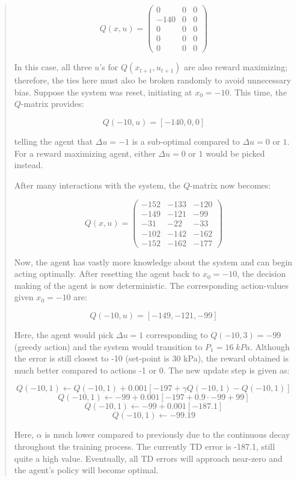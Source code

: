 \begin{quote}
    $$ Q(x, u) = \left(\begin{matrix}   0  &  0  & 0 \\
                                        -140 & 0 & 0 \\
                                        0 & 0 & 0 \\
                                        0 & 0 & 0 \\
                                        0 & 0 & 0 \end{matrix}\right) $$
                                        
    In this case, all three $u$'s for $Q(x_{t+1}, u_{t+1})$ are also reward maximizing; therefore, the ties here must also be broken randomly to avoid unnecessary bias. Suppose the system was reset, initiating at $x_0 = -10$.  This time, the $Q$-matrix provides:
    
    $$Q(-10, u) = [-140, 0, 0]$$
    
    telling the agent that $\Delta u = -1$ is a sub-optimal compared to $\Delta u = 0 \text{ or } 1$.  For a reward maximizing agent, either $\Delta u = 0 \text{ or } 1$ would be picked instead.  
    
    After many interactions with the system, the $Q$-matrix now becomes:
    
        $$ Q(x, u) = \left(\begin{matrix}   -152  &  -133  & -120 \\
                                        -149 & -121 & -99 \\
                                        -31 & -22 & -33 \\
                                        -102 & -142 & -162 \\
                                        -152 & -162 & -177 \end{matrix}\right) $$
    
    Now, the agent has vastly more knowledge about the system and can begin acting optimally. After resetting the agent back to $x_0 = -10$, the decision making of the agent is now deterministic.  The corresponding action-values given $x_0 = -10$ are:
    
    $$Q(-10, u) = [-149, -121, -99]$$
    
    Here, the agent would pick $\Delta u = 1$ corresponding to $Q(-10, 3) = -99$ (greedy action) and the system would transition to $P_1 = 16 \; kPa$.  Although the error is still closest to -10 (set-point is 30 kPa), the reward obtained is much better compared to actions -1 or 0.  The new update step is given as:
    
    $$Q(-10, 1) \leftarrow Q(-10, 1) + 0.001 [-197 + \gamma Q(-10, 1) - Q(-10, 1)]$$
    $$Q(-10, 1) \leftarrow -99 + 0.001 [-197 + 0.9 \cdot -99 + 99]$$
    $$Q(-10, 1) \leftarrow -99 + 0.001 [-187.1]$$
    $$Q(-10, 1) \leftarrow -99.19 $$
    
    Here, $\alpha$ is much lower compared to previously due to the continuous decay throughout the training process. The currently TD error is -187.1, still quite a high value.  Eventually, all TD errors will approach near-zero and the agent's policy will become optimal.
\end{quote}

